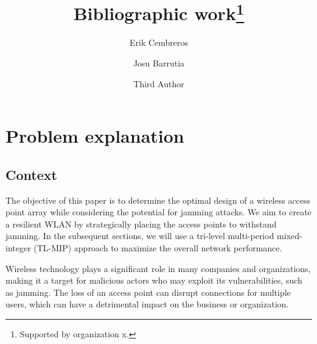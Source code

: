\documentclass[runningheads]{llncs}
\begin{document}
	\title{Bibliographic work\thanks{Supported by organization x.}}
	\author{Erik Cembreros \and
		Josu Barrutia \and
		Third Author}
	\maketitle              %
	\begin{abstract}
			
		
	\end{abstract}
	
	\clearpage

 \section{Problem explanation}
\subsection{Context}

 The objective of this paper is to determine the optimal design of a wireless access point array while considering the potential for jamming attacks. We aim to create a resilient WLAN by strategically placing the access points to withstand jamming. In the subsequent sections, we will use a tri-level multi-period mixed-integer (TL-MIP) approach to maximize the overall network performance.
 
Wireless technology plays a significant role in many companies and organizations, making it a target for malicious actors who may exploit its vulnerabilities, such as jamming. The loss of an access point can disrupt connections for multiple users, which can have a detrimental impact on the business or organization.
\end{document}
